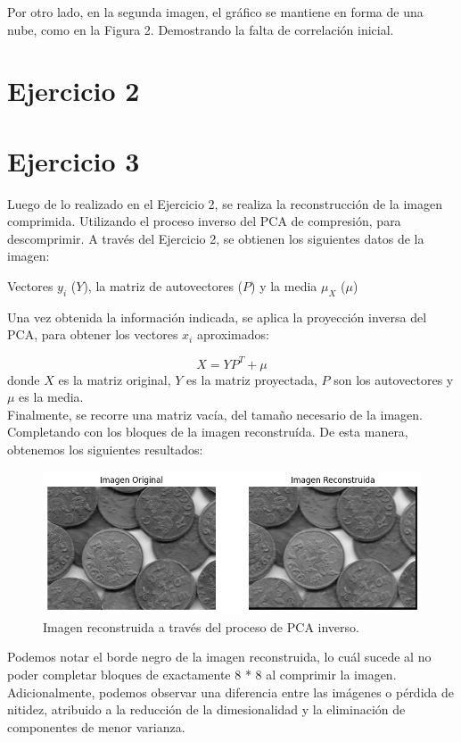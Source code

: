 \documentclass[a4paper,12pt]{article}
\begin{document}
Por otro lado, en la segunda imagen, el gráfico se mantiene en forma de una nube, como en la Figura 2. Demostrando la falta de correlación inicial.

\section {Ejercicio 2}

\section {Ejercicio 3}

Luego de lo realizado en el Ejercicio 2, se realiza la reconstrucción de la imagen comprimida. Utilizando el proceso inverso del PCA de compresión, para descomprimir.
A través del Ejercicio 2, se obtienen los siguientes datos de la imagen:

Vectores \(y_i\) (\(Y\)), la matriz de autovectores (\(P\)) y la media \(\mu_X\) (\(\mu\))

Una vez obtenida la información indicada, se aplica la proyección inversa del PCA, para obtener los vectores \(x_i\) aproximados:

\[
X = Y P^T + \mu
\]
donde \(X\) es la matriz original, \(Y\) es la matriz proyectada, \(P\) son los autovectores y \(\mu\) es la media.
\\
Finalmente, se recorre una matriz vacía, del tamaño necesario de la imagen. Completando con los bloques de la imagen reconstruída.
De esta manera, obtenemos los siguientes resultados:

\begin{figure}[H]
    \centering
    \includegraphics[width=1\textwidth]{Ejercicio3.png}
    \caption{Imagen reconstruida a través del proceso de PCA inverso.}
    \label{fig:ej3}
\end{figure}

Podemos notar el borde negro de la imagen reconstruida, lo cuál sucede al no poder completar bloques de exactamente 8 * 8 al comprimir la imagen.
Adicionalmente, podemos observar una diferencia entre las imágenes o pérdida de nitidez, atribuido a la reducción de la dimesionalidad y la eliminación de componentes de menor varianza.
\end{document}
